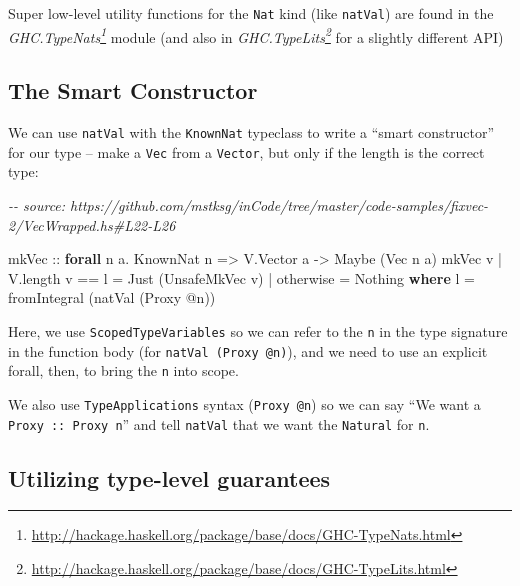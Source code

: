 \documentclass[]{article}
\newenvironment{Shaded}{}{}
\newcommand{\CommentTok}[1]{\textcolor[rgb]{0.38,0.63,0.69}{\textit{#1}}}
\newcommand{\DataTypeTok}[1]{\textcolor[rgb]{0.56,0.13,0.00}{#1}}
\newcommand{\FunctionTok}[1]{\textcolor[rgb]{0.02,0.16,0.49}{#1}}
\newcommand{\KeywordTok}[1]{\textcolor[rgb]{0.00,0.44,0.13}{\textbf{#1}}}
\newcommand{\NormalTok}[1]{#1}
\newcommand{\OperatorTok}[1]{\textcolor[rgb]{0.40,0.40,0.40}{#1}}
\newcommand{\OtherTok}[1]{\textcolor[rgb]{0.00,0.44,0.13}{#1}}
\renewcommand{\href}[2]{#2\footnote{\url{#1}}}
\begin{document}
Super low-level utility functions for the \texttt{Nat} kind (like
\texttt{natVal}) are found in the
\emph{\href{http://hackage.haskell.org/package/base/docs/GHC-TypeNats.html}{GHC.TypeNats}}
module (and also in
\emph{\href{http://hackage.haskell.org/package/base/docs/GHC-TypeLits.html}{GHC.TypeLits}}
for a slightly different API)

\hypertarget{the-smart-constructor}{%
\subsection{The Smart Constructor}\label{the-smart-constructor}}

We can use \texttt{natVal} with the \texttt{KnownNat} typeclass to write a
``smart constructor'' for our type -- make a \texttt{Vec} from a
\texttt{Vector}, but only if the length is the correct type:

\begin{Shaded}
\begin{Highlighting}[]
\CommentTok{{-}{-} source: https://github.com/mstksg/inCode/tree/master/code{-}samples/fixvec{-}2/VecWrapped.hs\#L22{-}L26}

\OtherTok{mkVec ::} \KeywordTok{forall}\NormalTok{ n a}\OperatorTok{.} \DataTypeTok{KnownNat}\NormalTok{ n }\OtherTok{=>} \DataTypeTok{V.Vector}\NormalTok{ a }\OtherTok{{-}>} \DataTypeTok{Maybe}\NormalTok{ (}\DataTypeTok{Vec}\NormalTok{ n a)}
\NormalTok{mkVec v }\OperatorTok{|}\NormalTok{ V.length v }\OperatorTok{==}\NormalTok{ l }\OtherTok{=} \DataTypeTok{Just}\NormalTok{ (}\DataTypeTok{UnsafeMkVec}\NormalTok{ v)}
        \OperatorTok{|} \FunctionTok{otherwise}       \OtherTok{=} \DataTypeTok{Nothing}
  \KeywordTok{where}
\NormalTok{    l }\OtherTok{=} \FunctionTok{fromIntegral}\NormalTok{ (natVal (}\DataTypeTok{Proxy} \OperatorTok{@}\NormalTok{n))}
\end{Highlighting}
\end{Shaded}

Here, we use \texttt{ScopedTypeVariables} so we can refer to the \texttt{n} in
the type signature in the function body (for \texttt{natVal\ (Proxy\ @n)}), and
we need to use an explicit forall, then, to bring the \texttt{n} into scope.

We also use \texttt{TypeApplications} syntax (\texttt{Proxy\ @n}) so we can say
``We want a \texttt{Proxy\ ::\ Proxy\ n}'' and tell \texttt{natVal} that we want
the \texttt{Natural} for \texttt{n}.

\hypertarget{utilizing-type-level-guarantees}{%
\subsection{Utilizing type-level
guarantees}\label{utilizing-type-level-guarantees}}
\end{document}
